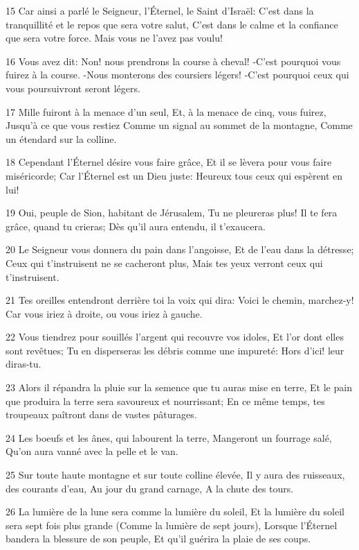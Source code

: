 \par 15 Car ainsi a parlé le Seigneur, l'Éternel, le Saint d'Israël: C'est dans la tranquillité et le repos que sera votre salut, C'est dans le calme et la confiance que sera votre force. Mais vous ne l'avez pas voulu!
\par 16 Vous avez dit: Non! nous prendrons la course à cheval! -C'est pourquoi vous fuirez à la course. -Nous monterons des coursiers légers! -C'est pourquoi ceux qui vous poursuivront seront légers.
\par 17 Mille fuiront à la menace d'un seul, Et, à la menace de cinq, vous fuirez, Jusqu'à ce que vous restiez Comme un signal au sommet de la montagne, Comme un étendard sur la colline.
\par 18 Cependant l'Éternel désire vous faire grâce, Et il se lèvera pour vous faire miséricorde; Car l'Éternel est un Dieu juste: Heureux tous ceux qui espèrent en lui!
\par 19 Oui, peuple de Sion, habitant de Jérusalem, Tu ne pleureras plus! Il te fera grâce, quand tu crieras; Dès qu'il aura entendu, il t'exaucera.
\par 20 Le Seigneur vous donnera du pain dans l'angoisse, Et de l'eau dans la détresse; Ceux qui t'instruisent ne se cacheront plus, Mais tes yeux verront ceux qui t'instruisent.
\par 21 Tes oreilles entendront derrière toi la voix qui dira: Voici le chemin, marchez-y! Car vous iriez à droite, ou vous iriez à gauche.
\par 22 Vous tiendrez pour souillés l'argent qui recouvre vos idoles, Et l'or dont elles sont revêtues; Tu en disperseras les débris comme une impureté: Hors d'ici! leur diras-tu.
\par 23 Alors il répandra la pluie sur la semence que tu auras mise en terre, Et le pain que produira la terre sera savoureux et nourrissant; En ce même temps, tes troupeaux paîtront dans de vastes pâturages.
\par 24 Les boeufs et les ânes, qui labourent la terre, Mangeront un fourrage salé, Qu'on aura vanné avec la pelle et le van.
\par 25 Sur toute haute montagne et sur toute colline élevée, Il y aura des ruisseaux, des courants d'eau, Au jour du grand carnage, A la chute des tours.
\par 26 La lumière de la lune sera comme la lumière du soleil, Et la lumière du soleil sera sept fois plus grande (Comme la lumière de sept jours), Lorsque l'Éternel bandera la blessure de son peuple, Et qu'il guérira la plaie de ses coups.
